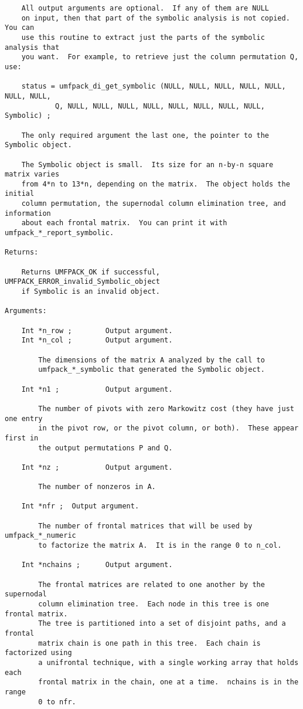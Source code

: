 \documentclass[11pt]{article}
\begin{document}
{\begin{verbatim}
    All output arguments are optional.  If any of them are NULL
    on input, then that part of the symbolic analysis is not copied.  You can
    use this routine to extract just the parts of the symbolic analysis that
    you want.  For example, to retrieve just the column permutation Q, use:

    status = umfpack_di_get_symbolic (NULL, NULL, NULL, NULL, NULL, NULL, NULL,
            Q, NULL, NULL, NULL, NULL, NULL, NULL, NULL, NULL, Symbolic) ;

    The only required argument the last one, the pointer to the Symbolic object.

    The Symbolic object is small.  Its size for an n-by-n square matrix varies
    from 4*n to 13*n, depending on the matrix.  The object holds the initial
    column permutation, the supernodal column elimination tree, and information
    about each frontal matrix.  You can print it with umfpack_*_report_symbolic.

Returns:

    Returns UMFPACK_OK if successful, UMFPACK_ERROR_invalid_Symbolic_object
    if Symbolic is an invalid object.

Arguments:

    Int *n_row ;        Output argument.
    Int *n_col ;        Output argument.

        The dimensions of the matrix A analyzed by the call to
        umfpack_*_symbolic that generated the Symbolic object.

    Int *n1 ;           Output argument.

        The number of pivots with zero Markowitz cost (they have just one entry
        in the pivot row, or the pivot column, or both).  These appear first in
        the output permutations P and Q.

    Int *nz ;           Output argument.

        The number of nonzeros in A.

    Int *nfr ;  Output argument.

        The number of frontal matrices that will be used by umfpack_*_numeric
        to factorize the matrix A.  It is in the range 0 to n_col.

    Int *nchains ;      Output argument.

        The frontal matrices are related to one another by the supernodal
        column elimination tree.  Each node in this tree is one frontal matrix.
        The tree is partitioned into a set of disjoint paths, and a frontal
        matrix chain is one path in this tree.  Each chain is factorized using
        a unifrontal technique, with a single working array that holds each
        frontal matrix in the chain, one at a time.  nchains is in the range
        0 to nfr.


\end{verbatim}}
\end{document}
